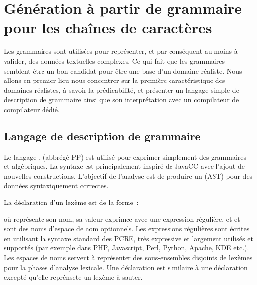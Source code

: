 \section{Génération à partir de grammaire pour les chaînes de caractères}
\label{section:data:strings}

Les grammaires sont utilisées pour représenter, et par conséquent au moins à
valider, des données textuelles complexes. Ce qui fait que les grammaires
semblent être un bon candidat pour être une base d'un domaine réaliste. Nous
allons en premier lieu nous concentrer sur la première caractéristique des
domaines réalistes, à savoir la prédicabilité, et présenter un langage simple de
description de grammaire ainsi que son interprétation avec un compilateur de
compilateur dédié.

\subsection{Langage de description de grammaire}
\label{subsection:data:pp}

Le langage , (abbrégé PP) est utilisé pour exprimer
simplement des grammaires  et algébriques. La syntaxe est
principalement inspiré de JavaCC avec l'ajout de nouvelles constructions.
L'objectif de l'analyse est de produire un 
(AST) pour des données syntaxiquement correctes.

La déclaration d'un lexème est de la forme~:

\begin{pre}
\end{pre}
%
où  représente son nom,  sa valeur exprimée avec une
expression régulière, et  et  sont des noms
d'espace de nom optionnels. Les expressions régulières sont écrites en utilisant
la syntaxe standard des PCRE, très expressive et largement utilisés et supportés
(par exemple dans PHP, Javascript, Perl, Python, Apache, KDE etc.). Les espaces
de noms servent à représenter des sous-ensembles disjoints de lexèmes pour la
phases d'analyse lexicale. Une déclaration  est similaire à une
déclaration  excepté qu'elle reprénsete un lexème à sauter.

